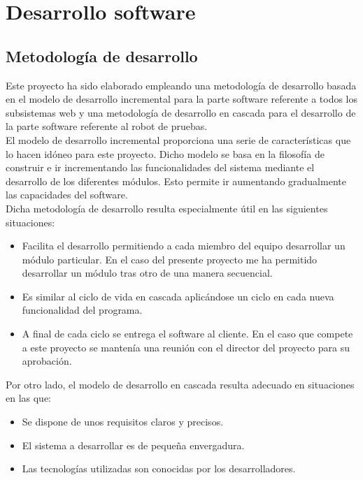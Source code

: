 \chapter{ Desarrollo software }
\label{chap:desarrollo-software}


\section{Metodología de desarrollo}

Este proyecto ha sido elaborado empleando una metodología de desarrollo basada en
el modelo de desarrollo incremental para la parte software referente a todos los subsistemas web y una metodología de desarrollo en cascada para el desarrollo de la parte
software referente al robot de pruebas.\\

El modelo de desarrollo incremental proporciona una serie de características que lo hacen idóneo para este proyecto. Dicho modelo se basa en la filosofía de construir 
e ir incrementando las funcionalidades del sistema mediante el desarrollo de los diferentes módulos. Esto permite ir aumentando gradualmente las capacidades del software. \\

Dicha metodología de desarrollo resulta especialmente útil en las siguientes situaciones:\\

\begin{itemize}
 \item Facilita el desarrollo permitiendo a cada miembro del equipo desarrollar un módulo particular. En el caso del presente proyecto me ha permitido desarrollar un módulo tras otro de una manera secuencial.
 \item Es similar al ciclo de vida en cascada aplicándose un ciclo en cada nueva funcionalidad del programa.
 \item A final de cada ciclo se entrega el software al cliente. En el caso que compete a este proyecto se mantenía una reunión con el director del proyecto para su aprobación.
\end{itemize}

Por otro lado, el modelo de desarrollo en cascada resulta adecuado en situaciones en las que:\\

\begin{itemize}
 \item Se dispone de unos requisitos claros y precisos.
 \item El sistema a desarrollar es de pequeña envergadura.
 \item Las tecnologías utilizadas son conocidas por los desarrolladores.
\end{itemize}


